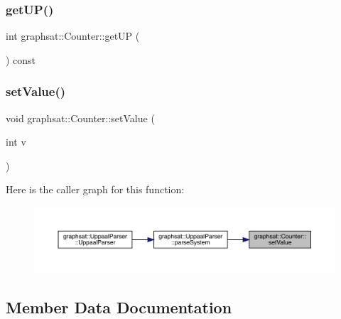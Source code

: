 \mbox{\label{classgraphsat_1_1_counter_a5b073dfc1370d3457cf693053d4b2d87}} 
\subsubsection{\texorpdfstring{getUP()}{getUP()}}
{\footnotesize\ttfamily int graphsat\+::\+Counter\+::get\+UP (\begin{DoxyParamCaption}{ }\end{DoxyParamCaption}) const\hspace{0.3cm}{\ttfamily [inline]}}

\mbox{\label{classgraphsat_1_1_counter_a738c85993973ea73559a7dd9e59de346}} 
\subsubsection{\texorpdfstring{setValue()}{setValue()}}
{\footnotesize\ttfamily void graphsat\+::\+Counter\+::set\+Value (\begin{DoxyParamCaption}\item[{int}]{v }\end{DoxyParamCaption})\hspace{0.3cm}{\ttfamily [inline]}}

Here is the caller graph for this function\+:
\nopagebreak
\begin{figure}[H]
\begin{center}
\leavevmode
\includegraphics[width=350pt]{classgraphsat_1_1_counter_a738c85993973ea73559a7dd9e59de346_icgraph}
\end{center}
\end{figure}


\subsection{Member Data Documentation}
\mbox{\label{classgraphsat_1_1_counter_a8e5a22b7c1cdb1d075aa0bba1e59ca7f}} 
